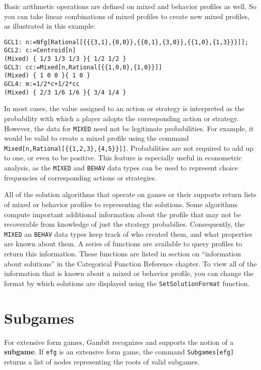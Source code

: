 Basic arithmetic operations are defined on mixed and behavior profiles
as well.  So you can take linear combinations of mixed profiles to
create new mixed profiles, as illustrated in this example:

\begin{verbatim}  
GCL1: n:=Nfg[Rational[{{{3,1},{0,0}},{{0,1},{3,0}},{{1,0},{1,3}}}]];
GCL2: c:=Centroid[n]
(Mixed) { 1/3 1/3 1/3 }{ 1/2 1/2 }
GCL3: cc:=Mixed[n,Rational[{{1,0,0},{1,0}}]]
(Mixed) { 1 0 0 }{ 1 0 }
GCL4: m:=1/2*c+1/2*cc
(Mixed) { 2/3 1/6 1/6 }{ 3/4 1/4 }
\end{verbatim}

In most cases, the value assigned to an action or strategy is
interpreted as the probability with which a player adopts the
corresponding action or strategy.  However, the data for \verb+MIXED+
need not be legitimate probabilities.  For example, it would be valid
to create a mixed profile using the command
\verb+Mixed[n,Rational[{{1,2,3},{4,5}}]]+.  Probabilities are not
required to add up to one, or even to be positive.  This feature is
especially useful in econometric analysis, as the \verb+MIXED+ and
\verb+BEHAV+ data types can be used to represent choice frequencies of
corresponding actions or strategies.  

All of the solution algorithms that operate on games or their supports
return lists of mixed or behavior profiles to representing the
solutions.  Some algorithms compute important additional information
about the profile that may not be recoverable from knowledge of just
the strategy probabilies.  Consequently, the \verb+MIXED+ an
\verb+BEHAV+ data types keep track of who created them, and what
properties are known about them.  A series of functions are available
to query profiles to return this information.  These functions are
listed in section on ``information about solutions'' in the
Categorical Function Reference chapter.  To view all of the
information that is known about a mixed or behavior profile, you can
change the format by which solutions are displayed using the
\verb+SetSolutionFormat+ function.

\section{Subgames}

For extensive form games, Gambit recognizes and supports the notion of
a {\bf subgame}.  If \verb+efg+ is an extensive form game, the command
\verb+Subgames[efg]+ returns a list of nodes representing the roots
of valid subgames.  

